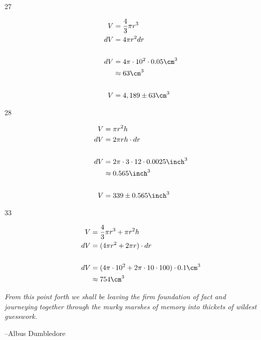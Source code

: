 \documentclass[fleqn]{exam}
\begin{document}
\begin{description}
\item[27]
\begin{align*}
  V  &= \frac{4}{3} \pi r^3 \\
  dV &= 4 \pi r^2 dr \\
  \\
  dV &= 4 \pi \cdot 10^2 \cdot 0.05 \cm^3 \\
     &\approx 63 \cm^3 \\
  \\
  V &= 4,189 \pm 63 \cm^3
\end{align*}

\item[28]
\begin{align*}
  V  &= \pi r^2 h \\
  dV &= 2 \pi rh \cdot dr \\
  \\
  dV &= 2 \pi \cdot 3 \cdot 12 \cdot 0.0025 \inch^3 \\
     &\approx 0.565 \inch^3 \\
  \\
  V &= 339 \pm 0.565 \inch^3
\end{align*}

\item[33]
\begin{align*}
  V  &= \frac{4}{3} \pi r^3 + \pi r^2 h \\
  dV &= (4 \pi r^2 + 2 \pi r) \cdot dr \\
  \\
  dV &= (4 \pi \cdot 10^2 + 2 \pi \cdot 10 \cdot 100) \cdot 0.1 \cm^3 \\
     &\approx 754 \cm^3 \\
\end{align*}

\end{description}


\else

\vspace{8 cm}

{\em From this point forth we shall be leaving the firm foundation of fact and journeying together
through the murky marshes of memory into thickets of wildest guesswork.}

\vspace{.2 cm}

\hspace{1 cm} --Albus Dumbledore




\fi
\end{document}
